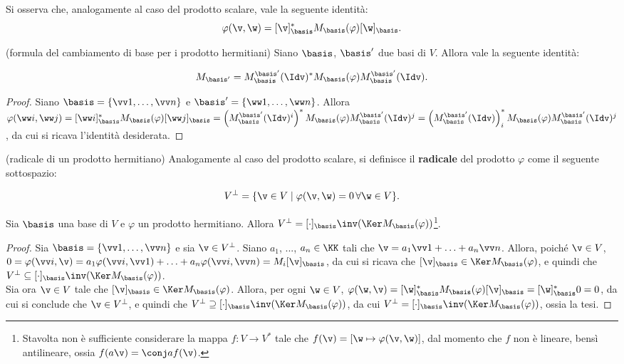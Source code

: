 \begin{remark}
	Si osserva che, analogamente al caso del prodotto scalare, vale
	la seguente identità:
	\[ \varphi(\v, \w) = [\v]_\basis^* M_\basis(\varphi) [\w]_\basis. \]
\end{remark}

\begin{proposition}
	(formula del cambiamento di base per i prodotto hermitiani) Siano
	$\basis$, $\basis'$ due basi di $V$. Allora vale la seguente
	identità:
	
	\[ M_{\basis'} = M_{\basis}^{\basis'}(\Idv)^* M_\basis(\varphi) M_{\basis}^{\basis'}(\Idv). \]
\end{proposition}

\begin{proof}
	Siano $\basis = \{ \vv 1, \ldots, \vv n \}$ e $\basis' = \{ \ww 1, \ldots, \ww n \}$. Allora $\varphi(\ww i, \ww j) = [\ww i]_\basis^* M_\basis(\varphi) [\ww j]_\basis = \left( M_\basis^{\basis'}(\Idv)^i \right)^* M_\basis(\varphi) M_\basis^{\basis'}(\Idv)^j =
	\left(M_\basis^{\basis'}(\Idv)\right)^*_i M_\basis(\varphi) M_\basis^{\basis'}(\Idv)^j$, da cui si ricava l'identità
	desiderata.
\end{proof}

\begin{definition} (radicale di un prodotto hermitiano)
	Analogamente al caso del prodotto scalare, si definisce il \textbf{radicale} del prodotto $\varphi$ come il seguente sottospazio: 
	
	\[ V^\perp = \{ \v \in V \mid \varphi(\v, \w) = 0 \, \forall \w \in V \}. \]
\end{definition}

\begin{proposition}
	Sia $\basis$ una base di $V$ e $\varphi$ un prodotto hermitiano. Allora $V^\perp = [\cdot]_\basis \inv (\Ker M_\basis(\varphi))$\footnote{Stavolta non è sufficiente considerare la mappa $f : V \to V^*$ tale che $f(\v) = \left[ \w \mapsto \varphi(\v, \w) \right]$, dal momento che $f$ non è lineare, bensì antilineare, ossia $f(a \v) = \conj a f(\v)$.}.
\end{proposition}

\begin{proof}
	Sia $\basis = \{ \vv 1, \ldots, \vv n \}$ e sia $\v \in V^\perp$.
	Siano $a_1$, ..., $a_n \in \KK$ tali che $\v = a_1 \vv 1 + \ldots + a_n \vv n$. Allora, poiché $\v \in V$, $0 = \varphi(\vv i, \v)
	= a_1 \varphi(\vv i, \vv 1) + \ldots + a_n \varphi(\vv i, \vv n) = M_i [\v]_\basis$, da cui si ricava che $[\v]_\basis \in \Ker M_\basis(\varphi)$, e quindi che $V^\perp \subseteq [\cdot]_\basis \inv (\Ker M_\basis(\varphi))$. \\
	
	Sia ora $\v \in V$ tale che $[\v]_\basis \in \Ker M_\basis(\varphi)$.
	Allora, per ogni $\w \in V$, $\varphi(\w, \v) = [\w]_\basis^* M_\basis(\varphi) [\v]_\basis = [\w]_\basis^* 0 = 0$, da cui si
	conclude che $\v \in V^\perp$, e quindi che  $V^\perp \supseteq [\cdot]_\basis \inv (\Ker M_\basis(\varphi))$, da cui
	$V^\perp = [\cdot]_\basis \inv (\Ker M_\basis(\varphi))$, ossia
	la tesi.
\end{proof}

